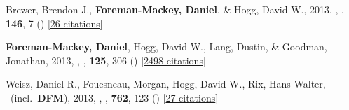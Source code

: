 \item[{\color{numcolor}\scriptsize3}] Brewer, Brendon J., \textbf{Foreman-Mackey, Daniel}, \& Hogg, David W., 2013, , \aj, \textbf{146}, 7 () [\href{http://adsabs.harvard.edu/abs/2013AJ....146....7B}{26 citations}]

\item[{\color{numcolor}\scriptsize2}] \textbf{Foreman-Mackey, Daniel}, Hogg, David W., Lang, Dustin, \& Goodman, Jonathan, 2013, , \pasp, \textbf{125}, 306 () [\href{http://adsabs.harvard.edu/abs/2013PASP..125..306F}{2498 citations}]

\item[{\color{numcolor}\scriptsize1}] Weisz, Daniel R., Fouesneau, Morgan, Hogg, David W., Rix, Hans-Walter, \etal\ (incl.\ \textbf{DFM}), 2013, , \apj, \textbf{762}, 123 () [\href{http://adsabs.harvard.edu/abs/2013ApJ...762..123W}{27 citations}]
